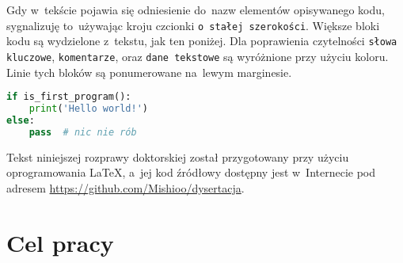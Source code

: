 Gdy w~tekście pojawia się odniesienie do~nazw elementów opisywanego kodu,
sygnalizuję to~używając kroju czcionki \lstinline!o stałej szerokości!.
Większe bloki kodu są wydzielone z~tekstu, jak ten poniżej.
Dla poprawienia czytelności 
\lstinline[basicstyle=\ttfamily\color{wongvermillion},columns=fixed]!słowa kluczowe!, 
\lstinline[basicstyle=\ttfamily\color{wongsky},columns=fixed]!komentarze!, oraz 
\lstinline[basicstyle=\ttfamily\color{wonggreen},columns=fixed]!dane tekstowe!
są wyróżnione przy użyciu koloru.
Linie tych bloków są ponumerowane na~lewym marginesie.

\begin{lstlisting}[language=Python]
if is_first_program():
    print('Hello world!')
else:
    pass  # nic nie rób
\end{lstlisting}

Tekst niniejszej rozprawy doktorskiej został przygotowany przy użyciu oprogramowania \LaTeX,
a~jej kod źródłowy dostępny jest w~Internecie pod adresem \url{https://github.com/Mishioo/dysertacja}.

\begin{fullwidth}
\printglossary[title=Wykaz skrótów, type=\acronymtype]
\end{fullwidth}

\section{Cel pracy}
